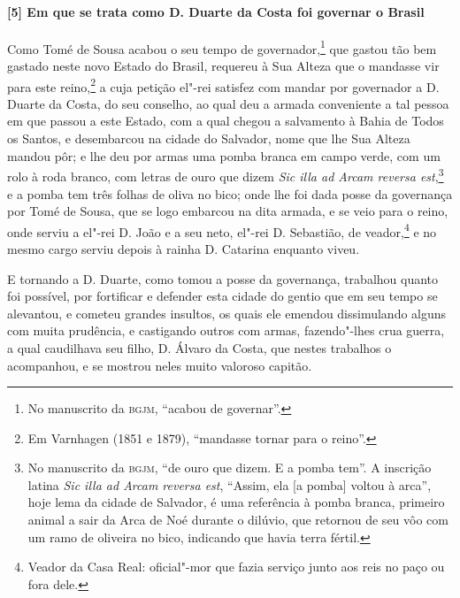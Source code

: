 \begin{linenumbers}
\paragraph{[5] Em que se trata como D. Duarte da Costa foi governar o Brasil} \quad
Como Tomé de Sousa acabou o seu tempo de governador,\footnote{ No manuscrito da
\textsc{bgjm}, ``acabou de governar''.} que gastou tão bem gastado neste novo Estado do
Brasil, requereu à Sua Alteza que o mandasse vir para este reino,\footnote{ Em Varnhagen
(1851 e 1879), ``mandasse tornar para o reino''.} a cuja petição el"-rei satisfez com
mandar por governador a D. Duarte da Costa, do seu conselho, ao qual deu a armada
conveniente a tal pessoa em que passou a este Estado, com a qual chegou a salvamento à
Bahia de Todos os Santos, e desembarcou na cidade do Salvador, nome que lhe Sua Alteza
mandou pôr; e lhe deu por armas uma pomba branca em campo verde, com um rolo à roda
branco, com letras de ouro que dizem \textit{Sic illa ad Arcam reversa est},\footnote{ No
manuscrito da \textsc{bgjm}, ``de ouro que dizem. E a pomba tem''. A inscrição latina
\textit{Sic illa ad Arcam reversa est}, ``Assim, ela [a pomba] voltou à arca'', hoje lema
da cidade de Salvador, é uma referência à pomba branca, primeiro animal a sair da Arca de
Noé durante o dilúvio, que retornou de seu vôo com um ramo de oliveira no bico, indicando
que havia terra fértil. } e a pomba tem três folhas de oliva no bico; onde lhe foi dada
posse da governança por Tomé de Sousa, que se logo embarcou na dita armada, e se veio para
o reino, onde serviu a el"-rei D. João e a seu neto, el"-rei D. Sebastião, de
veador,\footnote{ Veador da Casa Real: oficial"-mor que fazia serviço junto aos reis no paço
ou fora dele.} e no mesmo cargo serviu depois à rainha D. Catarina enquanto viveu.

E tornando a D. Duarte, como tomou a posse da governança, trabalhou quanto foi possível,
por fortificar e defender esta cidade do gentio que em seu tempo se alevantou, e cometeu
grandes insultos, os quais ele emendou dissimulando alguns com muita prudência, e
castigando outros com armas, fazendo"-lhes crua guerra, a qual caudilhava seu filho, D.
Álvaro da Costa, que nestes trabalhos o acompanhou, e se mostrou neles muito valoroso
capitão.


\end{linenumbers}
